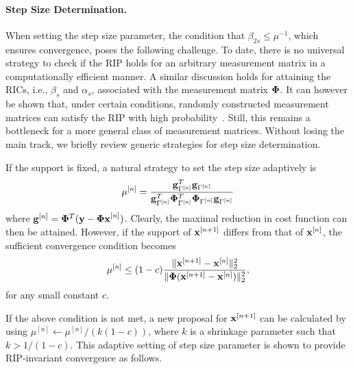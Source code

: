 \documentclass{article}
\begin{document}
\paragraph{Step Size Determination.} 
When setting the step size parameter, the condition that $\beta_{2s}\leq\mu^{-1}$, which ensures convergence, poses the following challenge. To date, there is no universal strategy  to check if the RIP holds for an arbitrary measurement matrix in a computationally efficient manner. A similar discussion holds for attaining the RICs, i.e., ${\beta_s}$ and $\alpha_s$, associated with the measurement matrix ${\bf \Phi}$. It can however be shown that, under certain conditions, randomly constructed measurement matrices can satisfy
the RIP with high probability~\cite{candes2008rip, chartrand2008rip}. Still, this remains a bottleneck for a more general class of
measurement matrices. Without losing the main track, we briefly review generic strategies for step size determination. 

If the support is fixed, a natural strategy to set the step size adaptively is~\cite{blumensath2010niht}
\begin{equation}\label{step_size}
   \mu^{[n]} = \frac{{\bf g}^T_{\Gamma^{[n]}}{\bf g}_{\Gamma^{[n]}}}{{\bf g}^T_{\Gamma^{[n]}}{\bf \Phi}^T_{\Gamma^{[n]}}{\bf \Phi}_{\Gamma^{[n]}}{\bf g}_{\Gamma^{[n]}}}
\end{equation}
where ${\bf g}^{[n]} = {\bf \Phi}^T({\bf y}-{\bf \Phi x}^{[n]})$. Clearly, the maximal reduction in cost function can then be attained. However, if the support of ${\bf x}^{[n+1]}$ differs from that of ${\bf x}^{[n]}$, the sufficient convergence condition  becomes
\begin{equation}
    \mu^{[n]} \leq(1-c) \frac{\|{\bf x}^{[n+1]}-{\bf x}^{[n]} \|_2^2}{\|{\bf \Phi}({\bf x}^{[n+1]}-{\bf x}^{[n]}) \|_2^2},
\end{equation}
for any small constant $c$.

If the above condition is not met, a new proposal for ${\bf x}^{[n+1]}$ can be calculated by using $\mu^{[n]}\leftarrow{\mu^{[n]}/(k(1-c))}$, where $k$ is a shrinkage parameter such that $k>1/(1-c)$.
This adaptive setting of step size parameter is shown to provide RIP-invariant convergence  as follows.
\end{document}
